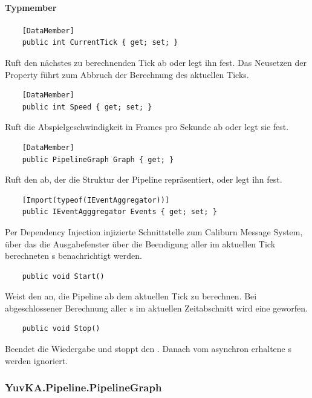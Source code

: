 \paragraph{Typmember}
\begin{itemize}

	\begin{verbatim}
	[DataMember]
	public int CurrentTick { get; set; }
	\end{verbatim} 
	Ruft den nächstes zu berechnenden Tick ab oder legt ihn fest. Das Neusetzen der Property führt zum Abbruch der Berechnung des aktuellen Ticks.

	\begin{verbatim}
	[DataMember]
	public int Speed { get; set; }
	\end{verbatim}
	Ruft die Abspielgeschwindigkeit in Frames pro Sekunde ab oder legt sie fest.

	\begin{verbatim}
	[DataMember]
	public PipelineGraph Graph { get; }
	\end{verbatim}
	Ruft den  ab, der die Struktur der Pipeline repräsentiert, oder legt ihn fest.

	\begin{verbatim}
	[Import(typeof(IEventAggregator))]
	public IEventAgggregator Events { get; set; }
	\end{verbatim}
	Per Dependency Injection injizierte Schnittstelle zum Caliburn Message System, über das die Ausgabefenster über die Beendigung aller im aktuellen Tick berechneten s benachrichtigt werden.



	\begin{verbatim}
	public void Start()
	\end{verbatim}
	Weist den  an, die Pipeline ab dem aktuellen Tick zu berechnen. Bei abgeschlossener Berechnung aller s im aktuellen Zeitabschnitt wird eine  geworfen.

	\begin{verbatim}
	public void Stop()
	\end{verbatim}
	Beendet die Wiedergabe und stoppt den . Danach vom  asynchron erhaltene s werden ignoriert.
\end{itemize}

\subsubsection{YuvKA.Pipeline.PipelineGraph}
	
